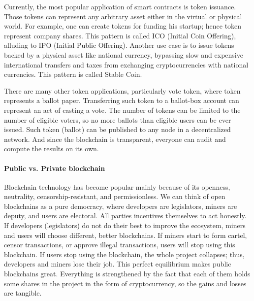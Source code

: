 \documentclass[applsci,article,submit,moreauthors,pdftex]{Definitions/mdpi}
\begin{document}
Currently, the most popular application of smart contracts is token issuance. Those tokens can represent any arbitrary asset either in the virtual or physical world.
For example, one can create tokens for funding his startup; hence token represent company shares. This pattern is called ICO (Initial Coin Offering), alluding to IPO (Initial Public Offering).
Another use case is to issue tokens backed by a physical asset like national currency, bypassing slow and expensive international transfers and taxes from exchanging cryptocurrencies with national currencies. This pattern is called Stable Coin. 

There are many other token applications, particularly vote token, where token represents a ballot paper. Transferring such token to a ballot-box account can represent an act of casting a vote. The number of tokens can be limited to the number of eligible voters, so no more ballots than eligible users can be ever issued. Such token (ballot) can be published to any node in a decentralized network. And since the blockchain is transparent, everyone can audit and compute the results on its own.

\paragraph{Public vs. Private blockchain}
Blockchain technology has become popular mainly because of its openness, neutrality, censorship-resistant, and permissionless.  We can think of open blockchains as a pure democracy, where developers are legislators, miners are deputy, and users are electoral. All parties incentives themselves to act honestly. If developers (legislators) do not do their best to improve the ecosystem, miners and users will choose different, better blockchains. If miners start to form cartel, censor transactions, or approve illegal transactions, users will stop using this blockchain. If users stop using the blockchain, the whole project collapses; thus, developers and miners lose their job. This perfect equilibrium makes public blockchains great. Everything is strengthened by the fact that each of them holds some shares in the project in the form of cryptocurrency, so the gains and losses are tangible. 
\end{document}

